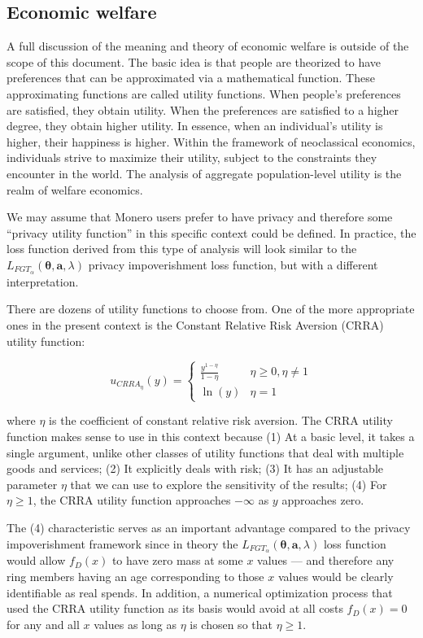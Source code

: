 \documentclass[english]{article}
\begin{document}
\subsection{Economic welfare}

A full discussion of the meaning and theory of economic welfare is
outside of the scope of this document. The basic idea is that people
are theorized to have preferences that can be approximated via a mathematical
function. These approximating functions are called utility functions.
When people's preferences are satisfied, they obtain utility. When
the preferences are satisfied to a higher degree, they obtain higher
utility. In essence, when an individual's utility is higher, their
happiness is higher. Within the framework of neoclassical economics,
individuals strive to maximize their utility, subject to the constraints
they encounter in the world. The analysis of aggregate population-level
utility is the realm of welfare economics.

We may assume that Monero users prefer to have privacy and therefore
some ``privacy utility function'' in this specific context could
be defined. In practice, the loss function derived from this type
of analysis will look similar to the $L_{FGT_{\alpha}}(\boldsymbol{\theta},\boldsymbol{a},\lambda)$
privacy impoverishment loss function, but with a different interpretation.

There are dozens of utility functions to choose from. One of the more
appropriate ones in the present context is the Constant Relative Risk
Aversion (CRRA) utility function:

\begin{equation}
u_{CRRA_{\eta}}(y)=\begin{cases}
\frac{y^{1-\eta}}{1-\eta} & \eta\geq0,\eta\neq1\\
\ln(y) & \eta=1
\end{cases}
\end{equation}

where $\eta$ is the coefficient of constant relative risk aversion.
The CRRA utility function makes sense to use in this context because
(1) At a basic level, it takes a single argument, unlike other classes
of utility functions that deal with multiple goods and services; (2)
It explicitly deals with risk; (3) It has an adjustable parameter
$\eta$ that we can use to explore the sensitivity of the results;
(4) For $\eta\geq1$, the CRRA utility function approaches $-\infty$
as $y$ approaches zero. 

The (4) characteristic serves as an important advantage compared to
the privacy impoverishment framework since in theory the $L_{FGT_{\alpha}}(\boldsymbol{\theta},\boldsymbol{a},\lambda)$
loss function would allow $f_{D}(x)$ to have zero mass at some $x$
values --- and therefore any ring members having an age corresponding
to those $x$ values would be clearly identifiable as real spends.
In addition, a numerical optimization process that used the CRRA utility
function as its basis would avoid at all costs $f_{D}(x)=0$ for any
and all $x$ values as long as $\eta$ is chosen so that $\eta\geq1$.
\end{document}
